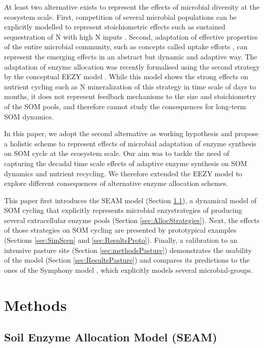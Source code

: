At least two alternative exists to represent the effects of microbial diversity
at the ecosystem scale. First, competition of several microbial populations can
be explicitly modelled to represent stoichiometric effects such as sustained
sequestration of N with high N inputs \citep{Perveen14}.
Second, adaptation of effective properties of the entire microbial community,
such as concepts called uptake efforts 
\citep{Rastetter97, Rastetter11}, can represent the emerging effects in an
abstract but dynamic and adaptive way. The adaptation of enzyme allocation was
recently formalised using the second strategy by the conceptual EEZY model
\citep{Moorhead12}.
While this model shows the strong effects on nutrient cycling such as N
mineralization of this strategy in time scale of days to months, it does not
represent feedback mechanisms to the size and stoichiometry of the SOM pools,
and therefore cannot study the consequences for long-term SOM dynamics.

In this paper, we adopt the second alternative as working hypothesis and propose
a holistic scheme to represent effects of microbial adaptation of enzyme
synthesis on SOM cycle at the ecosystem scale. Our aim was to tackle the need
of capturing the decadal time scale effects of adaptive enzyme synthesis on 
SOM dynamics and nutrient recycling. We therefore extended the EEZY model to
explore different consequences of alternative enzyme allocation schemes.

This paper first introduces the SEAM model (Section \ref{sec:SEAM}), a dynamical
model of SOM cycling that explicitly represents microbial enzystrategies of
producing several extracellular enzyme pools (Section
\ref{sec:AllocStrategies}). Next, the effects of those strategies on SOM cycling
are presented by prototypical examples (Sections \ref{sec:SimScen} and
\ref{sec:ResultsProto}).
Finally, a calibration to an intensive pasture site (Section
\ref{sec:methodsPasture}) demonstrates the usability of the model (Section
\ref{sec:ResultsPasture}) and compares its predictions to the ones of the
Symphony model \citep{Perveen14}, which explicitly models several
microbial-groups. 

\section{Methods}
\subsection{Soil Enzyme Allocation Model (SEAM)}
\label{sec:SEAM}

